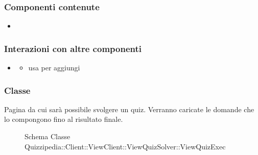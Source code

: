 \subsubsection{Componenti contenute}
\begin{itemize}
\item {}
\end{itemize}
\subsubsection{Interazioni con altre componenti}
\begin{itemize}
\item {}
\begin{itemize}
\item usa  per aggiungi
\end{itemize}
\end{itemize}
\subsubsection{Classe }
Pagina da cui sarà possibile svolgere un quiz. Verranno caricate le domande che lo compongono fino al risultato finale.
\begin{figure}[H]
\centering
\noindent{}
\caption[Schema Classe ViewQuizExec]{Schema Classe Quizzipedia::Client::ViewClient::ViewQuizSolver::ViewQuizExec}
\end{figure}
